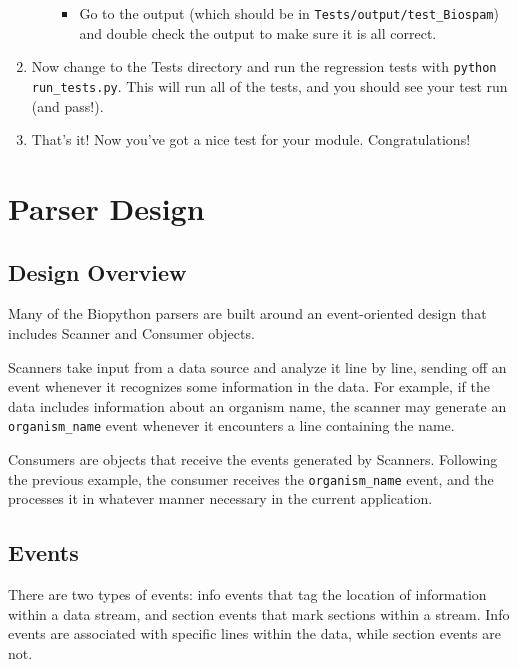 \documentclass{report}
\begin{document}
\begin{enumerate}
\begin{enumerate}
\begin{itemize}
       \item Go to the output (which should be in \verb|Tests/output/test_Biospam|) and double check the output to make sure it is all correct. 

   \end{itemize}

 \end{enumerate}
       
 \item Now change to the Tests directory and run the regression tests
       with \verb|python run_tests.py|. This will run all of the tests, and
       you should see your test run (and pass!).
       
  \item That's it! Now you've got a nice test for your module.
       Congratulations!
\end{enumerate}


\section{Parser Design}

\subsection{Design Overview}

Many of the Biopython parsers are built around an event-oriented design that includes
Scanner and Consumer objects.


Scanners take input from a data source and analyze it line by line,
sending off an event whenever it recognizes some information in the
data.  For example, if the data includes information about an organism
name, the scanner may generate an \verb|organism_name| event whenever it
encounters a line containing the name.


Consumers are objects that receive the events generated by Scanners.
Following the previous example, the consumer receives the
\verb|organism_name| event, and the processes it in whatever manner
necessary in the current application.

\subsection{Events}

There are two types of events: info events that tag the location of
information within a data stream, and section events that mark
sections within a stream.  Info events are associated with specific
lines within the data, while section events are not.
\end{document}
